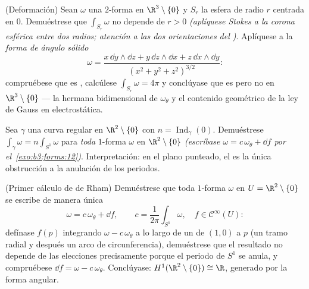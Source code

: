 \begin{exercise}[$\star\star\star$]\label{exo:b3:forms:10}
(Deformación) Sean $\omega$ una $2$-forma
\emph{} en
$\R^3\setminus\{0\}$ y $S_r$ la esfera de radio $r$ centrada en $0$.
Demuéstrese que $\int_{S_r}\omega$ no depende de $r > 0$
\emph{(aplíquese Stokes a la corona esférica entre dos radios; atención
a las dos orientaciones del
)}. Aplíquese a la \emph{forma de
ángulo sólido}
\[
\omega = \frac{x\,\dd y\wedge\dd z + y\,\dd z\wedge\dd x +
z\,\dd x\wedge\dd y}{(x^2 + y^2 + z^2)^{3/2}} :
\]
compruébese que es , calcúlese
$\int_{S_r}\omega = 4\pi$ y conclúyase que es
 pero no
 en $\R^3\setminus\{0\}$ --- la
hermana bidimensional de $\omega_\theta$ y el contenido geométrico de la
ley de Gauss en electrostática.
\end{exercise}

\begin{exercise}[$\star\star$]\label{exo:b3:forms:11}
Sea $\gamma$ una curva 
regular en $\R^2\setminus\{0\}$ con $n = \operatorname{Ind}_\gamma(0)$.
Demuéstrese $\int_\gamma\omega = n\int_{S^1}\omega$ para \emph{toda}
$1$-forma  $\omega$ en
$\R^2\setminus\{0\}$ \emph{(escríbase $\omega = c\,\omega_\theta
+ \dd f$ por el~\cref{exo:b3:forms:12})}. Interpretación: en el plano
punteado, el  es la única
obstrucción a la anulación de los periodos.
\end{exercise}

\begin{exercise}[$\star\star\star$]\label{exo:b3:forms:12}
(Primer cálculo de de Rham) Demuéstrese que toda
 $1$-forma $\omega$ en
$U = \R^2\setminus\{0\}$ se escribe de manera única
\[
\omega = c\,\omega_\theta + \dd f,
\qquad c = \frac1{2\pi}\int_{S^1}\omega,\quad f \in
\mathcal C^\infty(U) :
\]
defínase $f(p)$ integrando $\omega - c\,\omega_\theta$ a lo largo de un
 de $(1,0)$ a $p$ (un
tramo radial y después un arco de circunferencia), demuéstrese que el
resultado no depende de las elecciones precisamente porque el periodo de
$S^1$ se anula, y compruébese $\dd
f = \omega - c\,\omega_\theta$. Conclúyase:
$H^1(\R^2\setminus\{0\}) \cong \R$, generado por la forma angular.
\end{exercise}

